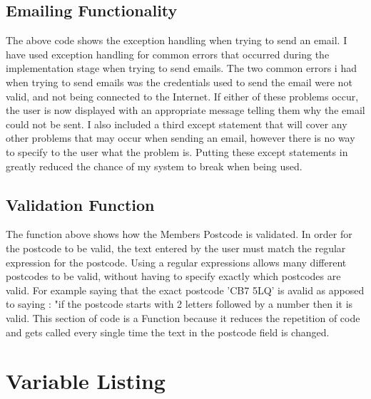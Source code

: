 \subsection{Emailing Functionality}
\begin{figure}[H]
\end{figure}

The above code shows the exception handling when trying to send an email. I have used exception handling for common errors that occurred during the implementation stage when trying to send emails. The two common errors i had when trying to send emails was the credentials used to send the email were not valid, and not being connected to the Internet. If either of these problems occur, the user is now displayed with an appropriate message telling them why the email could not be sent. I also included a third except statement that will cover any other problems that may occur when sending an email, however there is no way to specify to the user what the problem is. Putting these except statements in greatly reduced the chance of my system to break when being used.

\subsection{Validation Function}
\begin{figure}[H]
\end{figure}

The function above shows how the Members Postcode is validated. In order for the postcode to be valid, the text entered by the user must match the regular expression for the postcode. Using a regular expressions allows many different postcodes to be valid, without having to specify exactly which postcodes are valid. For example saying that the exact postcode 'CB7 5LQ' is avalid as apposed to saying : "if the postcode starts with 2 letters followed by a number then it is valid. This section of code is a Function because it reduces the repetition of code and gets called every single time the text in the postcode field is changed. 

\pagebreak

\section{Variable Listing}

